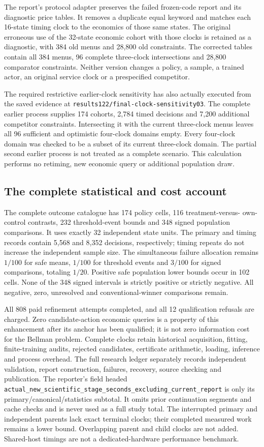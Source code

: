 The report's protocol adapter preserves the failed frozen-code report and
its diagnostic price tables. It removes a duplicate equal keyword and
matches each 16-state timing clock to the economics of those same states.
The original erroneous use of the 32-state economic cohort with those
clocks is retained as a diagnostic, with 384 old menus and 28,800 old
constraints. The corrected tables contain all 384 menus, 96 complete
three-clock intersections and 28,800 comparator constraints. Neither
version changes a policy, a sample, a trained actor, an original service
clock or a prespecified competitor.

The required restrictive earlier-clock sensitivity has also actually executed
from the saved evidence at
\nolinkurl{results122/final-clock-sensitivity03}. The complete earlier
process supplies 174 cohorts, 2,784 timed decisions and 7,200 additional
competitor constraints. Intersecting it with the current three-clock menus
leaves all 96 sufficient and optimistic four-clock domains empty. Every
four-clock domain was checked to be a subset of its current three-clock
domain. The partial second earlier process is not treated as a complete
scenario. This calculation performs no retiming, new economic query or
additional population draw.

\subsection{The complete statistical and cost account}
The complete outcome catalogue has 174 policy cells, 116 treatment-versus-
own-control contrasts, 232 threshold-event bounds and 348 signed population
comparisons. It uses exactly 32 independent state units. The primary and
timing records contain 5,568 and 8,352 decisions, respectively; timing
repeats do not increase the independent sample size. The simultaneous
failure allocation remains $1/100$ for safe means, $1/100$ for threshold
events and $3/100$ for signed comparisons, totaling $1/20$.
Positive safe population lower bounds occur in 102 cells. None of the
348 signed intervals is strictly positive or strictly negative.
All negative, zero, unresolved and conventional-winner comparisons remain.

All 808 paid refinement attempts completed, and all 12 qualification
refusals are charged. Zero candidate-action economic queries is a
property of this enhancement after its anchor has been qualified; it is
not zero information cost for the Bellman problem. Complete clocks retain
historical acquisition, fitting, finite-training audits, rejected
candidates, certificate arithmetic, loading, inference and process overhead.
The full research ledger separately records independent validation, report
construction, failures, recovery, source checking and publication.
The reporter's field headed
\nolinkurl{actual_new_scientific_stage_seconds_excluding_current_report}
is only its primary/canonical/statistics subtotal. It omits prior
continuation segments and cache checks and is never used as a full study
total. The interrupted primary and independent parents lack exact terminal
clocks; their completed measured work remains a lower bound. Overlapping
parent and child clocks are not added. Shared-host timings are not a
dedicated-hardware performance benchmark.

